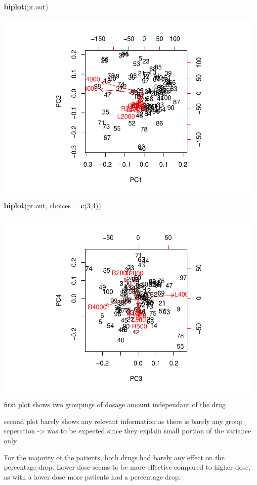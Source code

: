\documentclass[]{article}
\newenvironment{Shaded}{\begin{snugshade}}{\end{snugshade}}
\newcommand{\KeywordTok}[1]{\textcolor[rgb]{0.13,0.29,0.53}{\textbf{#1}}}
\newcommand{\DataTypeTok}[1]{\textcolor[rgb]{0.13,0.29,0.53}{#1}}
\newcommand{\DecValTok}[1]{\textcolor[rgb]{0.00,0.00,0.81}{#1}}
\newcommand{\NormalTok}[1]{#1}
\begin{document}
\begin{Shaded}
\begin{Highlighting}[]
\KeywordTok{biplot}\NormalTok{(pr.out)}
\end{Highlighting}
\end{Shaded}

\includegraphics{assignment1_PCA_files/figure-latex/unnamed-chunk-11-1.pdf}

\begin{Shaded}
\begin{Highlighting}[]
\KeywordTok{biplot}\NormalTok{(pr.out, }\DataTypeTok{choices =} \KeywordTok{c}\NormalTok{(}\DecValTok{3}\NormalTok{,}\DecValTok{4}\NormalTok{))}
\end{Highlighting}
\end{Shaded}

\includegraphics{assignment1_PCA_files/figure-latex/unnamed-chunk-11-2.pdf}

first plot shows two groupings of dosage amount independant of the drug

second plot barely shows any relevant information as there is barely any
group seperation -\textgreater{} was to be expected since they explain
small portion of the variance only

For the majority of the patients, both drugs had barely any effect on
the percentage drop. Lower dose seems to be more effective compared to
higher dose, as with a lower dose more patients had a percentage drop.
\end{document}
